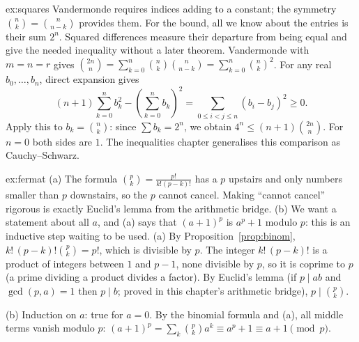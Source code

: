 \begin{solution}{ex:squares}
\idea Vandermonde requires indices adding to a constant; the symmetry $\binom nk=\binom n{n-k}$ provides them. For the bound, all we know about the entries is their sum $2^n$. Squared differences measure their departure from being equal and give the needed inequality without a later theorem.
\writeup Vandermonde with $m=n=r$ gives $\binom{2n}n=\sum_{k=0}^n\binom nk\binom n{n-k}=\sum_{k=0}^n\binom nk^2$. For any real $b_0,\dots,b_n$, direct expansion gives
\[
(n+1)\sum_{k=0}^n b_k^2-\left(\sum_{k=0}^n b_k\right)^2
=\sum_{0\le i<j\le n}(b_i-b_j)^2\ge0.
\]
Apply this to $b_k=\binom nk$: since $\sum b_k=2^n$, we obtain $4^n\le(n+1)\binom{2n}n$. For $n=0$ both sides are $1$. The inequalities chapter generalises this comparison as Cauchy--Schwarz.
\end{solution}

\begin{solution}{ex:fermat}
\idea (a) The formula $\binom pk=\frac{p!}{k!(p-k)!}$ has a $p$ upstairs and only numbers smaller than $p$ downstairs, so the $p$ cannot cancel. Making ``cannot cancel'' rigorous is exactly Euclid's lemma from the arithmetic bridge. (b) We want a statement about all $a$, and (a) says that $(a+1)^p$ is $a^p+1$ modulo $p$: this is an inductive step waiting to be used.
\writeup (a) By Proposition~\ref{prop:binom}, $k!\,(p-k)!\binom pk=p!$, which is divisible by $p$. The integer $k!\,(p-k)!$ is a product of integers between $1$ and $p-1$, none divisible by $p$, so it is coprime to $p$ (a prime dividing a product divides a factor). By Euclid's lemma (if $p\mid ab$ and $\gcd(p,a)=1$ then $p\mid b$; proved in this chapter's arithmetic bridge), $p\mid\binom pk$.

(b) Induction on $a$: true for $a=0$. By the binomial formula and (a), all middle terms vanish modulo $p$:
$(a+1)^p=\sum_k\binom pka^k\equiv a^p+1\equiv a+1\pmod p$.
\end{solution}

